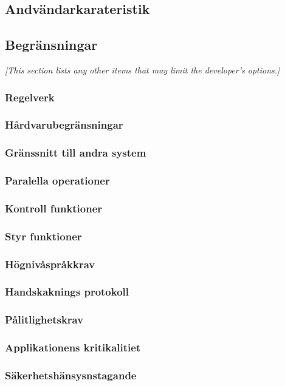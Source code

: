 \documentclass{article}
\begin{document}
\subsection{Andvändarkarateristik}

\subsection{Begränsningar}
\emph{[This section lists any other items that may limit the developer's
  options.]}

\subsubsection{Regelverk}
\subsubsection{Hårdvarubegränsningar}
\subsubsection{Gränssnitt till andra system}
\subsubsection{Paralella operationer}
\subsubsection{Kontroll funktioner}
\subsubsection{Styr funktioner}
\subsubsection{Högnivåspråkkrav}
\subsubsection{Handskaknings protokoll}
\subsubsection{Pålitlighetskrav}
\subsubsection{Applikationens kritikalitiet}
\subsubsection{Säkerhetshänsysnstagande}
\end{document}
